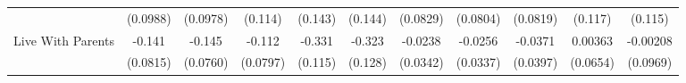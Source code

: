 {\begin{tabular}{l*{10}{c}}
            &    (0.0988)         &    (0.0978)         &     (0.114)         &     (0.143)         &     (0.144)         &    (0.0829)         &    (0.0804)         &    (0.0819)         &     (0.117)         &     (0.115)         \\
\addlinespace
Live With Parents&      -0.141         &      -0.145         &      -0.112         &      -0.331\sym{**} &      -0.323\sym{*}  &     -0.0238         &     -0.0256         &     -0.0371         &     0.00363         &    -0.00208         \\
            &    (0.0815)         &    (0.0760)         &    (0.0797)         &     (0.115)         &     (0.128)         &    (0.0342)         &    (0.0337)         &    (0.0397)         &    (0.0654)         &    (0.0969)         \\
\bottomrule
\end{tabular}
}
